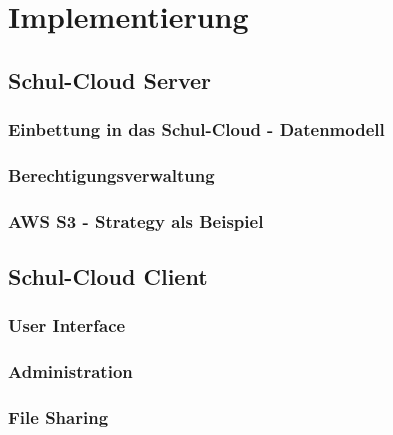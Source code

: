 \section{Implementierung}
\label{sec:implementation}

\subsection{Schul-Cloud Server}
\subsubsection{Einbettung in das Schul-Cloud - Datenmodell}
\subsubsection{Berechtigungsverwaltung}
\subsubsection{AWS S3 - Strategy als Beispiel}


\subsection{Schul-Cloud Client}
\subsubsection{User Interface}
\subsubsection{Administration}
\subsubsection{File Sharing}

\clearpage
